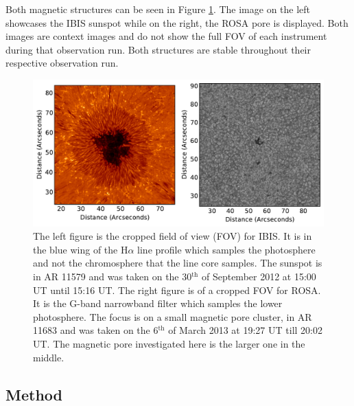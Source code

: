     Both magnetic structures can be seen in Figure \ref{fig:data_overview}.
    The image on the left showcases the  IBIS sunspot while on the right, the ROSA pore is displayed.
    Both images are context images and do not show the full FOV of each instrument during that observation run.
    Both structures are stable throughout their respective observation run.

    \begin{figure}
        \centering
        \includegraphics[width=\textwidth]{overview.pdf}
        \caption{
                The left figure is the cropped field of view (FOV) for IBIS.
                It is in the blue wing of the H$\alpha$ line profile which samples the photosphere and not the chromosphere that the line core samples.
                The sunspot is in AR 11579 and was taken on the 30$^{\mathrm{th}}$ of September 2012 at 15:00 UT until 15:16 UT.
                The right figure is of a cropped FOV for ROSA.
                It is the G-band narrowband filter which samples the lower photosphere.
                The focus is on a small magnetic pore cluster, in AR 11683 and was taken on the 6$^{\mathrm{th}}$ of March 2013 at 19:27 UT till 20:02 UT.
                The magnetic pore investigated here is the larger one in the middle.
                }
        \label{fig:data_overview}
    \end{figure}
    
    \subsection{Method}
        
